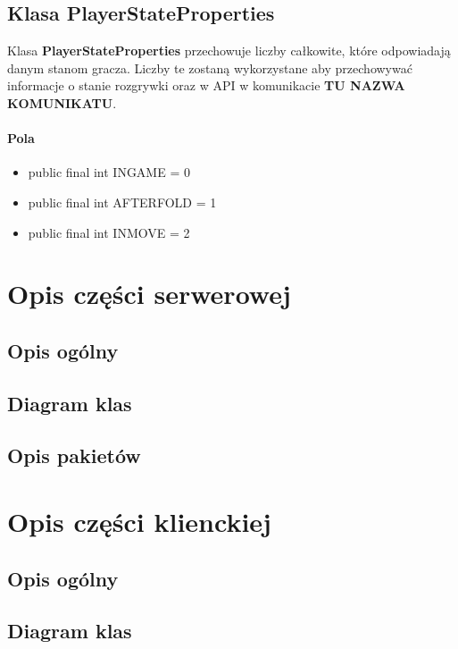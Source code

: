 \documentclass{article}
\begin{document}
    \subsection{Klasa PlayerStateProperties}
        Klasa \textbf{PlayerStateProperties} przechowuje liczby całkowite, które odpowiadają danym stanom gracza.
        Liczby te zostaną wykorzystane aby przechowywać informacje o stanie rozgrywki oraz w API w komunikacie \textbf{TU NAZWA KOMUNIKATU}.
        \paragraph{Pola}
            \begin{itemize}
                \item public final int INGAME = 0
                \item public final int AFTERFOLD = 1
                \item public final int INMOVE = 2
            \end{itemize}

\section{Opis części serwerowej}
    \subsection{Opis ogólny}
    
    \subsection{Diagram klas}
    
    \subsection{Opis pakietów}


\section{Opis części klienckiej}
    \subsection{Opis ogólny}
    
    \subsection{Diagram klas}
    
\end{document}
